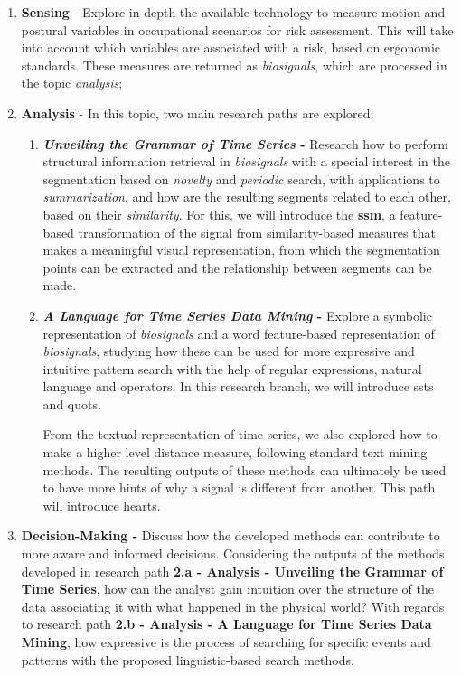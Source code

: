 \begin{enumerate}

\item \textbf{Sensing} - Explore in depth the available technology to measure motion and postural variables in occupational scenarios for risk assessment. This will take into account which variables are associated with a risk, based on ergonomic standards. These measures are returned as \textit{biosignals}, which are processed in the topic \textit{analysis};

\item \textbf{Analysis} - In this topic, two main research paths are explored: 
	\begin{enumerate}
		\item \textbf{\textit{Unveiling the Grammar of Time Series} -} Research how to perform structural information retrieval in \textit{biosignals} with a special interest in the segmentation based on \textit{novelty} and \textit{periodic} search, with applications to \textit{summarization}, and how are the resulting segments related to each other, based on their \textit{similarity}. For this, we will introduce the \textbf{\gls{ssm}}, a feature-based transformation of the signal from similarity-based measures that makes a meaningful visual representation, from which the segmentation points can be extracted and the relationship between segments can be made. 
		\item \textbf{\textit{A Language for Time Series Data Mining} - } Explore a symbolic representation of \textit{biosignals} and a word feature-based representation of \textit{biosignals}, studying how these can be used for more expressive and intuitive pattern search with the help of regular expressions, natural language and operators. In this research branch, we will introduce \gls{ssts} and \gls{quots}. 
		
From the textual representation of time series, we also explored how to make a higher level distance measure, following standard text mining methods. The resulting outputs of these methods can ultimately be used to have more hints of why a signal is different from another. This path will introduce \gls{hearts}.

	\end{enumerate}

\item \textbf{Decision-Making -} Discuss how the developed methods can contribute to more aware and informed decisions. Considering the outputs of the methods developed in research path \textbf{2.a - Analysis - Unveiling the Grammar of Time Series}, how can the analyst gain intuition over the structure of the data associating it with what happened in the physical world? With regards to research path \textbf{2.b - Analysis - A Language for Time Series Data Mining}, how expressive is the process of searching for specific events and patterns with the proposed linguistic-based search methods.

\end{enumerate}


